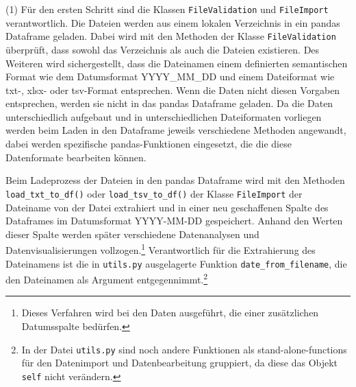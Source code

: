     
    (1) Für den ersten Schritt sind die Klassen \texttt{FileValidation} und \texttt{FileImport} verantwortlich.
    Die Dateien werden aus einem lokalen Verzeichnis in ein pandas Dataframe geladen. 
    Dabei wird mit den Methoden der Klasse \texttt{FileValidation} überprüft, dass sowohl das Verzeichnis als auch die Dateien existieren. 
    Des Weiteren wird sichergestellt, dass die Dateinamen einem definierten semantischen Format wie dem Datumsformat YYYY\_MM\_DD und 
    einem Dateiformat wie txt-, xlsx- oder tsv-Format entsprechen. Wenn die Daten nicht diesen Vorgaben entsprechen, werden sie nicht in
    das pandas Dataframe geladen. Da die Daten unterschiedlich aufgebaut und in unterschiedlichen Dateiformaten vorliegen 
    werden beim Laden in den Dataframe jeweils verschiedene Methoden angewandt, dabei werden spezifische pandas-Funktionen eingesetzt,
    die die diese Datenformate bearbeiten können. 
    
    Beim Ladeprozess der Dateien in den pandas Dataframe wird mit den Methoden \texttt{load\_txt\_to\_df()} oder \texttt{load\_tsv\_to\_df()} 
    der Klasse \texttt{FileImport} der Dateiname von der Datei extrahiert und in einer neu geschaffenen Spalte des Dataframes im Datumsformat YYYY-MM-DD gespeichert.
    Anhand den Werten dieser Spalte werden später verschiedene Datenanalysen und Datenvisualisierungen vollzogen.\footnote{Dieses Verfahren wird bei den Daten ausgeführt, die einer zusätzlichen Datumsspalte bedürfen.} 
    Verantwortlich für die Extrahierung des Dateinamens ist die in \texttt{utils.py} ausgelagerte Funktion \texttt{date\_from\_filename},
    die den Dateinamen als Argument entgegennimmt.\footnote{In der Datei \texttt{utils.py} sind noch andere Funktionen als stand-alone-functions für den Datenimport und Datenbearbeitung gruppiert,
    da diese das Objekt \texttt{self} nicht verändern.} 
    
